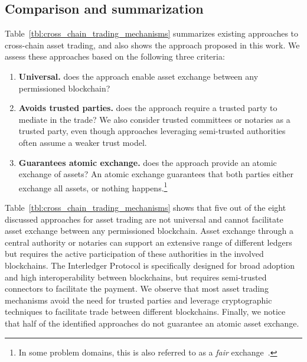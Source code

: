 \subsection{Comparison and summarization}
Table~\ref{tbl:cross_chain_trading_mechanisms} summarizes existing approaches to cross-chain asset trading, and also shows the approach proposed in this work.
We assess these approaches based on the following three criteria:
\begin{enumerate}
	\item \textbf{Universal.} does the approach enable asset exchange between any permissioned blockchain?
	\item \textbf{Avoids trusted parties.} does the approach require a trusted party to mediate in the trade? We also consider trusted committees or notaries as a trusted party, even though approaches leveraging semi-trusted authorities often assume a weaker trust model.
	\item \textbf{Guarantees atomic exchange.} does the approach provide an atomic exchange of assets? An atomic exchange guarantees that both parties either exchange all assets, or nothing happens.\footnote{In some problem domains, this is also referred to as a \emph{fair} exchange~\cite{asokan1997optimistic}.}
\end{enumerate}

Table~\ref{tbl:cross_chain_trading_mechanisms} shows that five out of the eight discussed approaches for asset trading are not universal and cannot facilitate asset exchange between any permissioned blockchain.
Asset exchange through a central authority or notaries can support an extensive range of different ledgers but requires the active participation of these authorities in the involved blockchains.
The Interledger Protocol is specifically designed for broad adoption and high interoperability between blockchains, but requires semi-trusted connectors to facilitate the payment.
We observe that most asset trading mechanisms avoid the need for trusted parties and leverage cryptographic techniques to facilitate trade between different blockchains.
Finally, we notice that half of the identified approaches do not guarantee an atomic asset exchange.

